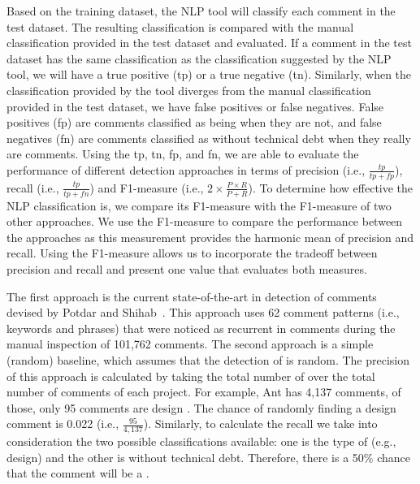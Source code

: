 Based on the training dataset, the NLP tool will classify each comment in the test dataset. The resulting classification is compared with the manual classification provided in the test dataset and evaluated. If a comment in the test dataset has the same classification as the classification suggested by the NLP tool, we will have a true positive (tp) or a true negative (tn).  Similarly, when the classification provided by the tool diverges from the manual classification provided in the test dataset, we have false positives or false negatives. False positives (fp) are comments classified as being \SATD when they are not, and false negatives (fn) are comments classified as without technical debt when they really are \SATD comments. Using the tp, tn, fp, and fn, we are able to evaluate the performance of different detection approaches in terms of precision (i.e., $\frac{tp}{tp + fp}$), recall (i.e., $\frac{tp}{tp + fn}$) and F1-measure (i.e., $2 \times \frac{P \times R}{P + R}$). To determine how effective the NLP classification is, we compare its F1-measure with the F1-measure of two other approaches. We use the F1-measure to compare the performance between the approaches as this measurement provides the harmonic mean of precision and recall. Using the F1-measure allows us to incorporate the tradeoff between precision and recall and present one value that evaluates both measures.

The first approach is the current state-of-the-art in detection of \SATD comments devised by Potdar and Shihab~\cite{Potdar2014ICSME}. This approach uses 62 comment patterns (i.e., keywords and phrases) that were noticed as recurrent in \SATD comments during the manual inspection of 101,762 comments. The second approach is a simple (random) baseline, which assumes that the detection of \SATD is random. The precision of this approach is calculated by taking the total number of \SATD over the total number of comments of each project. For example, Ant has 4,137 comments, of those, only 95 comments are design \SATD. The chance of randomly finding a design \SATD comment is 0.022 (i.e., $\frac{95}{4,137}$). Similarly, to calculate the recall we take into consideration the two possible classifications available: one is the type of \SATD (e.g., design) and the other is without technical debt. Therefore, there is a 50\% chance that the comment will be a \SATD. 

